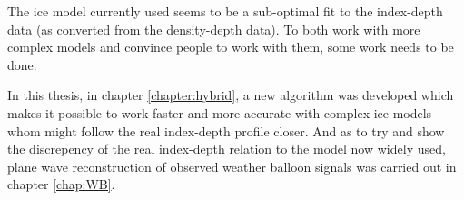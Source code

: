 The ice model currently used seems to be a sub-optimal fit to the index-depth
data (as converted from the density-depth data).  To both work with more
complex models and convince people to work with them, some work needs
to be done.  

In this thesis, in chapter \ref{chapter:hybrid}, a new algorithm was developed
which makes it possible to work faster and more accurate with complex ice
models whom might follow the real index-depth profile closer. And as to try and
show the discrepency of the real index-depth relation to the model now widely
used, plane wave reconstruction of observed weather balloon signals was carried
out in chapter \ref{chap:WB}.
